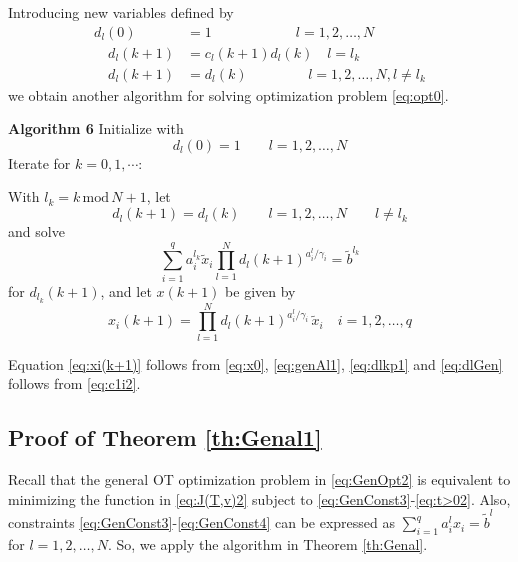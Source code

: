 \documentclass[twocolumn]{article}
\begin{document}
Introducing  new variables defined by
\begin{align*}
d_l(0) &= 1 	\qquad \qquad \qquad l=1,2,\dots, N\\
\quad  d_l(k+1) &=c_l(k+1)d_l(k) \quad  l=l_k  \\
\quad  d_l(k+1) &=d_l(k)  \, \, \qquad \qquad l=1,2,\dots, N,  l\neq l_k
\end{align*}
we obtain another algorithm for solving  optimization problem \eqref{eq:opt0}.


{\bf Algorithm 6}
Initialize with
 \[
d_l(0) = 1\qquad l=1,2,\dots, N 
\]
Iterate for $k=0,1, \cdots$:

With
$
l_k =  k\, \text{mod}\, N +1
$,
let
\begin{equation}
\label{eq:dlkp1}
d_l(k+1) =d_l(k)  \qquad  l=1,2,\dots, N \qquad  l\neq l_k
    \end{equation}
    and
solve 
\begin{equation}
\label{eq:dlGen}
 \sum_{i=1}^q {a^{l_k}_{i}}\tilde{x}_i   \prod_{l=1}^Nd_{l}(k+1)^{a^l_{i}/\gamma_i}
   = \tilde{b}^{l_k}
 \end{equation}
 for $d_{l_k}(k+1)$,
and let $x(k+1)$ be given by 
\begin{equation}
\label{eq:xi(k+1)}
x_i(k+1) = \prod_{l=1}^Nd_{l}(k+1)^{a^l_{i}/\gamma_i}\, \tilde{x}_i
	\quad i=1,2,\dots, q
\end{equation}

Equation  \eqref{eq:xi(k+1)} follows from \eqref{eq:x0}, \eqref{eq:genAl1}, \eqref{eq:dlkp1}  and \eqref{eq:dlGen} follows from \eqref{eq:c1i2}.



\subsection{Proof of Theorem \ref{th:Genal1}}
\label{sec:prth1}

Recall that the general OT optimization problem in  \eqref{eq:GenOpt2}  is equivalent to minimizing the function in 
\eqref{eq:J(T,v)2} subject to \eqref{eq:GenConst3}-\eqref{eq:t>02}.
 Also,  constraints \eqref{eq:GenConst3}-\eqref{eq:GenConst4} can be expressed as
$\sum_{i=1}^qa^l_{i}x_i = \tilde{b}^l$ for $l=1,2,\dots, N$.
 So, we apply the algorithm in Theorem \ref{th:Genal}.
\end{document}
